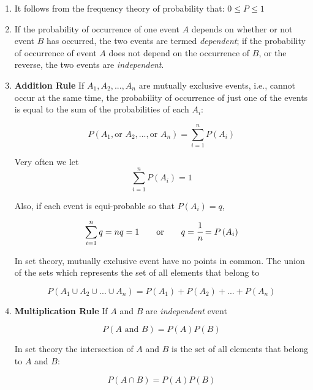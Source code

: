 \documentclass[a4paper,fleqn]{cas-dc}
\begin{document}
\begin{enumerate}
	\item It follows from the frequency theory of probability that: $0 \leq P \leq 1$
	\item If the probability of occurrence of one event $A$ depends on whether or not event $B$ has occurred, the two events are termed \textit{dependent}; if the probability of occurrence of event $A$ does not depend on the occurrence of $B$, or the reverse, the two events are \textit{independent}.
	\item \textbf{Addition Rule}
	If $A_1,A_2,...,A_n$ are mutually exclusive events, i.e., cannot occur at the same time, the probability of occurrence of just one of the events is equal to the sum of the probabilities of each $A_i$:
	
	\begin{equation}
		P\left( A_1, \text{or~} A_2,..., \text{or~} A_n \right) = \sum_{i=1}^{n} P\left( A_i \right)
	\end{equation}

	Very often we let
	\begin{equation}
		\sum_{i=1}^{n} P\left( A_i \right) = 1
	\end{equation}
	
	Also, if each event is equi-probable so that $P(A_i) = q$,
	
	\begin{equation}
		\sum_{i=1}^{n} q = nq = 1 \qquad \text{or} \qquad  q=\cfrac{1}{n} = P\left( A_i \right)
	\end{equation}
	
	In set theory, mutually exclusive event have no points in common. The union of the sets which represents the set of all elements that belong to
	
	\begin{equation}
		P\left( A_1 \cup A_2 \cup ... \cup A_n \right) = P(A_1) + P(A_2) + ... + P(A_n)
	\end{equation}

	\item \textbf{Multiplication Rule}
	If $A$ and $B$ are \textit{independent} event
	
	\begin{equation}
		P\left( A \text{~and~} B\right) = P(A)P(B)
	\end{equation}
	
	In set theory the intersection of $A$ and $B$ is the set of all elements that belong to $A$ and $B$:

	\begin{equation} \label{EQ: Probabiltiy_independet_a}
		P\left( A \cap B  \right) = P(A)P(B)
	\end{equation}


\end{enumerate}
\end{document}
